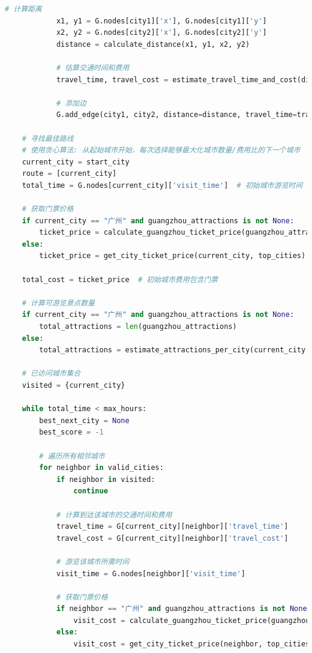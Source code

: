 \documentclass[withoutpreface,bwprint]{cumcmthesis} %
\begin{document}
\begin{appendices}
\begin{lstlisting}[language=python]
            # 计算距离
            x1, y1 = G.nodes[city1]['x'], G.nodes[city1]['y']
            x2, y2 = G.nodes[city2]['x'], G.nodes[city2]['y']
            distance = calculate_distance(x1, y1, x2, y2)
            
            # 估算交通时间和费用
            travel_time, travel_cost = estimate_travel_time_and_cost(distance)
            
            # 添加边
            G.add_edge(city1, city2, distance=distance, travel_time=travel_time, travel_cost=travel_cost)
    
    # 寻找最佳路线
    # 使用贪心算法: 从起始城市开始，每次选择能够最大化城市数量/费用比的下一个城市
    current_city = start_city
    route = [current_city]
    total_time = G.nodes[current_city]['visit_time']  # 初始城市游览时间
    
    # 获取门票价格
    if current_city == "广州" and guangzhou_attractions is not None:
        ticket_price = calculate_guangzhou_ticket_price(guangzhou_attractions)
    else:
        ticket_price = get_city_ticket_price(current_city, top_cities)
        
    total_cost = ticket_price  # 初始城市费用包含门票
    
    # 计算可游览景点数量
    if current_city == "广州" and guangzhou_attractions is not None:
        total_attractions = len(guangzhou_attractions)
    else:
        total_attractions = estimate_attractions_per_city(current_city, top_cities)
    
    # 已访问城市集合
    visited = {current_city}
    
    while total_time < max_hours:
        best_next_city = None
        best_score = -1
        
        # 遍历所有相邻城市
        for neighbor in valid_cities:
            if neighbor in visited:
                continue
                
            # 计算到达该城市的交通时间和费用
            travel_time = G[current_city][neighbor]['travel_time']
            travel_cost = G[current_city][neighbor]['travel_cost']
            
            # 游览该城市所需时间
            visit_time = G.nodes[neighbor]['visit_time']
            
            # 获取门票价格
            if neighbor == "广州" and guangzhou_attractions is not None:
                visit_cost = calculate_guangzhou_ticket_price(guangzhou_attractions)
            else:
                visit_cost = get_city_ticket_price(neighbor, top_cities)
            

\end{lstlisting}
\end{appendices}
\end{document}
